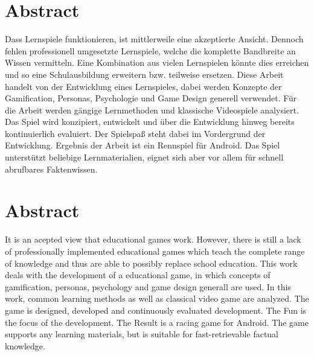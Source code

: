 \section*{Abstract}
Dass Lernspiele funktionieren, ist mittlerweile eine akzeptierte Ansicht. Dennoch fehlen professionell umgesetzte Lernspiele, welche die komplette Bandbreite an Wissen vermitteln. Eine Kombination aus vielen Lernspielen könnte dies erreichen und so eine Schulausbildung erweitern bzw. teilweise ersetzen.
Diese Arbeit handelt von der Entwicklung eines Lernspieles, dabei werden Konzepte der Gamification, Personas, Psychologie und Game Design generell verwendet. Für die Arbeit werden gängige Lernmethoden und klassische Videospiele analysiert. Das Spiel wird konzipiert, entwickelt und über die Entwicklung hinweg bereits kontinuierlich evaluiert. Der Spielspaß steht dabei im Vordergrund der Entwicklung.
Ergebnis der Arbeit ist ein Rennspiel für Android. Das Spiel unterstützt beliebige Lernmaterialien, eignet sich aber vor allem für schnell abrufbares Faktenwissen.

\vfill

\section*{Abstract}
It is an acepted view that educational games work. However, there is still a lack of professionally implemented educational games which teach the complete range of knowledge and thus are able to possibly replace school education.
This work deals with the development of a educational game, in which concepts of gamification, personas, psychology and game design generall are used. In this work, common learning methods as well as classical video game are analyzed. The game is designed, developed and continuously evaluated development. The Fun is the focus of the development.
The Result is a racing game for Android. The game supports any learning materials, but is suitable for fast-retrievable factual knowledge.

\vfill\vfill\newpage
